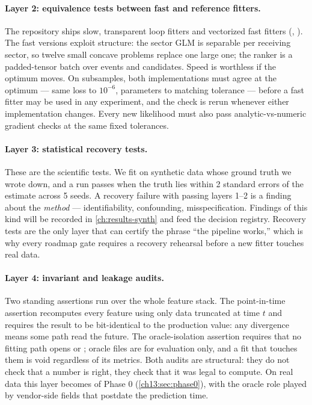 \paragraph{Layer 2: equivalence tests between fast and reference fitters.} The repository ships slow,
transparent loop fitters and vectorized fast fitters (, ).
The fast versions exploit structure: the sector GLM is separable per receiving sector, so twelve small concave
problems replace one large one; the ranker is a padded-tensor batch over events and candidates. Speed is
worthless if the optimum moves. On subsamples, both implementations must agree at the optimum --- same loss to
$10^{-6}$, parameters to matching tolerance --- before a fast fitter may be used in any experiment, and the
check is rerun whenever either implementation changes. Every new likelihood must also pass
analytic-vs-numeric gradient checks at the same fixed tolerances.

\paragraph{Layer 3: statistical recovery tests.} These are the scientific tests. We fit on synthetic data
whose ground truth we wrote down, and a run passes when the truth lies within 2 standard errors of the
estimate across 5 seeds. A recovery failure with passing layers 1--2 is a finding about the \emph{method} ---
identifiability, confounding, misspecification. Findings of this kind will be recorded in
\cref{ch:results-synth} and feed the decision registry. Recovery tests are the only layer that can certify the
phrase ``the pipeline works,'' which is why every roadmap gate requires a recovery rehearsal before a new
fitter touches real data.

\paragraph{Layer 4: invariant and leakage audits.} Two standing assertions run over the whole feature stack.
The point-in-time assertion recomputes every feature using only data truncated at time $t$ and requires the
result to be bit-identical to the production value: any divergence means some path read the future. The
oracle-isolation assertion requires that no fitting path opens  or
; oracle files are for evaluation only, and a fit that touches them is void
regardless of its metrics. Both audits are structural: they do not check that a number is right, they check
that it was legal to compute. On real data this layer becomes  of Phase 0
(\cref{ch13:sec:phase0}), with the oracle role played by vendor-side fields that postdate the prediction time.

